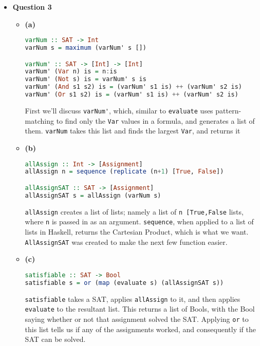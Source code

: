 \documentclass[12pt]{article}
\begin{document}
\begin{itemize}
    \pagebreak
  \item \textbf{Question 3}
    \begin{itemize}
      \item \textbf{(a)}
        \begin{lstlisting}[language=haskell]
varNum :: SAT -> Int
varNum s = maximum (varNum' s [])

varNum' :: SAT -> [Int] -> [Int]
varNum' (Var n) is = n:is
varNum' (Not s) is = varNum' s is
varNum' (And s1 s2) is = (varNum' s1 is) ++ (varNum' s2 is)
varNum' (Or s1 s2) is = (varNum' s1 is) ++ (varNum' s2 is)
        \end{lstlisting} 
        First we'll discuss \verb|varNum'|, which, similar to \verb|evaluate| uses pattern-matching to find only the
        \verb|Var| values in a formula, and generates a list of them. \verb|varNum| takes this list and finds the largest
        \verb|Var|, and returns it

      \item \textbf{(b)}
        \begin{lstlisting}[language=Haskell]
allAssign :: Int -> [Assignment]
allAssign n = sequence (replicate (n+1) [True, False])

allAssignSAT :: SAT -> [Assignment]
allAssignSAT s = allAssign (varNum s)
        \end{lstlisting}
        \verb|allAssign| creates a list of lists; namely a list of \verb|n [True,False| lists, where \verb|n| is passed in as
        an argument. \verb|sequence|, when applied to a list of lists in Haskell, returns the Cartesian Product, which is what
        we want. \verb|AllAssignSAT| was created to make the next few function easier.

      \item \textbf{(c)}
        \begin{center}
        \begin{lstlisting}[language=Haskell]
satisfiable :: SAT -> Bool
satisfiable s = or (map (evaluate s) (allAssignSAT s))
        \end{lstlisting}
        \end{center}
        \verb|satisfiable| takes a SAT, applies \verb|allAssign| to it, and then applies \verb|evaluate| to the resultant
        list. This returns a list of Bools, with the Bool saying whether or not that assignment solved the SAT. Applying
        \verb|or| to this list tells us if any of the assignments worked, and consequently if the SAT can be solved.


\end{itemize}
\end{itemize}
\end{document}
